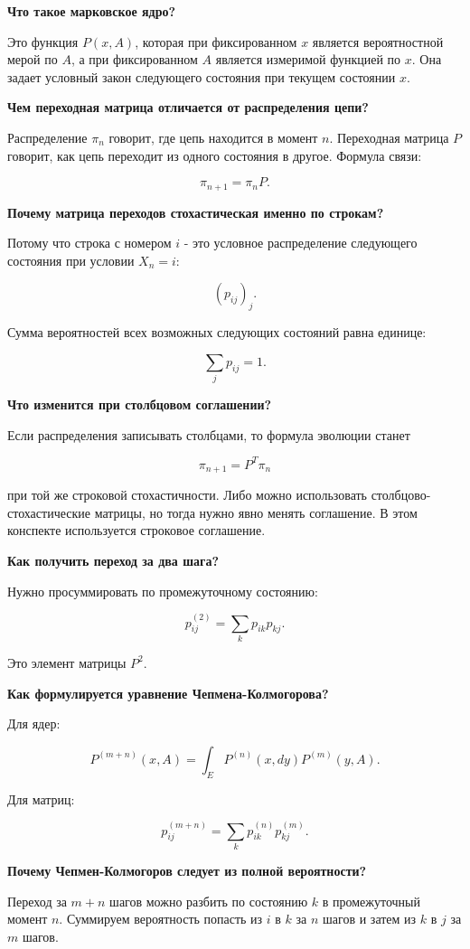 \documentclass[
  11pt,
  a4paper,
]{article}
\begin{document}
\textbf{Что такое марковское ядро?}

Это функция \(P(x,A)\), которая при фиксированном \(x\) является
вероятностной мерой по \(A\), а при фиксированном \(A\) является
измеримой функцией по \(x\). Она задает условный закон следующего
состояния при текущем состоянии \(x\).

\textbf{Чем переходная матрица отличается от распределения цепи?}

Распределение \(\pi_n\) говорит, где цепь находится в момент \(n\).
Переходная матрица \(P\) говорит, как цепь переходит из одного состояния
в другое. Формула связи:

\[
\pi_{n+1}=\pi_nP.
\]

\textbf{Почему матрица переходов стохастическая именно по строкам?}

Потому что строка с номером \(i\) - это условное распределение
следующего состояния при условии \(X_n=i\):

\[
(p_{ij})_j.
\]

Сумма вероятностей всех возможных следующих состояний равна единице:

\[
\sum_jp_{ij}=1.
\]

\textbf{Что изменится при столбцовом соглашении?}

Если распределения записывать столбцами, то формула эволюции станет

\[
\pi_{n+1}=P^T\pi_n
\]

при той же строковой стохастичности. Либо можно использовать
столбцово-стохастические матрицы, но тогда нужно явно менять соглашение.
В этом конспекте используется строковое соглашение.

\textbf{Как получить переход за два шага?}

Нужно просуммировать по промежуточному состоянию:

\[
p_{ij}^{(2)}=\sum_kp_{ik}p_{kj}.
\]

Это элемент матрицы \(P^2\).

\textbf{Как формулируется уравнение Чепмена-Колмогорова?}

Для ядер:

\[
P^{(m+n)}(x,A)
=
\int_E P^{(n)}(x,dy)P^{(m)}(y,A).
\]

Для матриц:

\[
p_{ij}^{(m+n)}
=
\sum_kp_{ik}^{(n)}p_{kj}^{(m)}.
\]

\textbf{Почему Чепмен-Колмогоров следует из полной вероятности?}

Переход за \(m+n\) шагов можно разбить по состоянию \(k\) в
промежуточный момент \(n\). Суммируем вероятность попасть из \(i\) в
\(k\) за \(n\) шагов и затем из \(k\) в \(j\) за \(m\) шагов.
\end{document}
